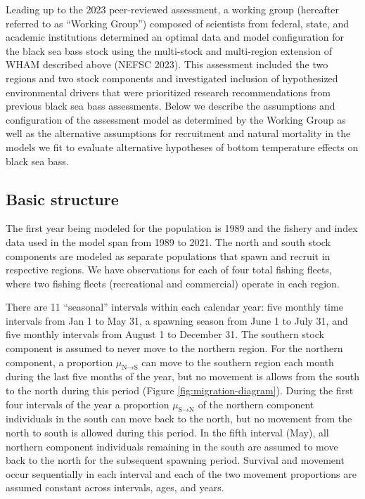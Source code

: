 \documentclass[
]{article}
\begin{document}
Leading up to the 2023 peer-reviewed assessment, a working group (hereafter referred to as ``Working Group'') composed of scientists from federal, state, and academic institutions determined an optimal data and model configuration for the black sea bass stock using the multi-stock and multi-region extension of WHAM described above (NEFSC 2023). This assessment included the two regions and two stock components and investigated inclusion of hypothesized environmental drivers that were prioritized research recommendations from previous black sea bass assessments. Below we describe the assumptions and configuration of the assessment model as determined by the Working Group as well as the alternative assumptions for recruitment and natural mortality in the models we fit to evaluate alternative hypotheses of bottom temperature effects on black sea bass.

\hypertarget{basic-structure}{%
\subsection*{Basic structure}\label{basic-structure}}

The first year being modeled for the population is 1989 and the fishery and index data used in the model span from 1989 to 2021. The north and south stock components are modeled as separate populations that spawn and recruit in respective regions. We have observations for each of four total fishing fleets, where two fishing fleets (recreational and commercial) operate in each region.

There are 11 ``seasonal'' intervals within each calendar year: five monthly time intervals from Jan 1 to May 31, a spawning season from June 1 to July 31, and five monthly intervals from August 1 to December 31. The southern stock component is assumed to never move to the northern region. For the northern component, a proportion \(\mu_{\text{N}\rightarrow \text{S}}\) can move to the southern region each month during the last five months of the year, but no movement is allows from the south to the north during this period (Figure \ref{fig:migration-diagram}). During the first four intervals of the year a proportion \(\mu_{\text{S}\rightarrow \text{N}}\) of the northern component individuals in the south can move back to the north, but no movement from the north to south is allowed during this period. In the fifth interval (May), all northern component individuals remaining in the south are assumed to move back to the north for the subsequent spawning period. Survival and movement occur sequentially in each interval and each of the two movement proportions are assumed constant across intervals, ages, and years.
\end{document}
